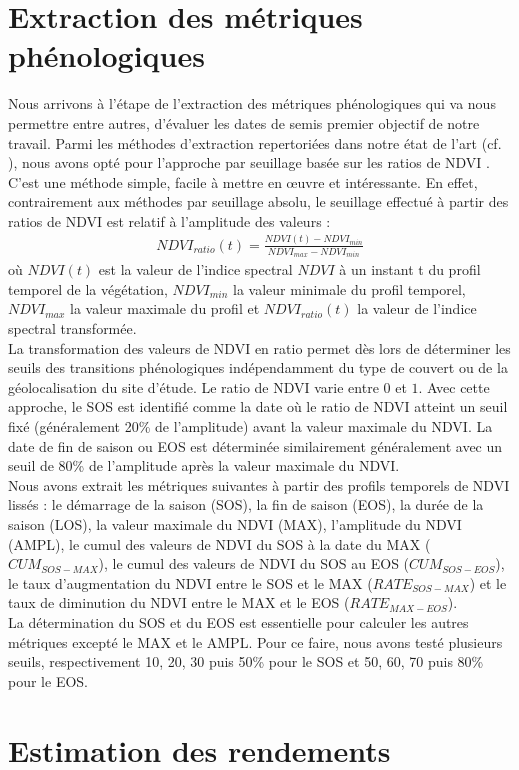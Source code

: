 \section{Extraction des métriques phénologiques}
Nous arrivons à l'étape de l'extraction des métriques phénologiques qui va nous permettre entre autres, d'évaluer les dates de semis premier objectif de notre travail. Parmi les méthodes d'extraction repertoriées dans notre état de l'art (cf. ), nous avons opté pour l'approche par seuillage basée sur les ratios de NDVI \citep{White1997}. C'est une méthode simple, facile à mettre en \oe uvre et intéressante. En effet, contrairement aux méthodes par seuillage absolu, le seuillage effectué à partir des ratios de NDVI est relatif à l'amplitude des valeurs : 
\begin{align}
 NDVI_{ratio}(t) = \frac{NDVI(t) - NDVI_{min}}{NDVI_{max}-NDVI_{min}} %
\end{align}
où $NDVI(t)$ est la valeur de l'indice spectral $NDVI$ à un instant t du profil temporel de la végétation, $NDVI_{min}$ la valeur minimale du profil temporel, $NDVI_{max}$ la valeur maximale du profil et $NDVI_{ratio}(t)$ la valeur de l'indice spectral transformée. 
\\La transformation des valeurs de NDVI en ratio permet dès lors de déterminer les seuils des transitions phénologiques indépendamment du type de couvert ou de la géolocalisation du site d'étude. Le ratio de NDVI varie entre $0$ et $1$. Avec cette approche, le SOS est identifié comme la date où le ratio de NDVI atteint un seuil fixé (généralement 20\% de l'amplitude) avant la valeur maximale du NDVI. La date de fin de saison ou EOS est déterminée similairement généralement avec un seuil de 80\% de l'amplitude après la valeur maximale du NDVI.
\\Nous avons extrait les métriques suivantes à partir des profils temporels de NDVI lissés : le démarrage de la saison (SOS), la fin de saison (EOS), la durée de la saison (LOS), la valeur maximale du NDVI (MAX), l'amplitude du NDVI (AMPL), le cumul des valeurs de NDVI du SOS à la date du MAX ($CUM_{SOS-MAX}$), le cumul des valeurs de NDVI du SOS au EOS ($CUM_{SOS-EOS}$), le taux d'augmentation du NDVI entre le SOS et le MAX ($RATE_{SOS-MAX}$) et le taux de diminution du NDVI entre le MAX et le EOS ($RATE_{MAX-EOS}$).
\\La détermination du SOS et du EOS est essentielle pour calculer les autres métriques excepté le MAX et le AMPL. Pour ce faire, nous avons testé plusieurs seuils, respectivement 10, 20, 30 puis 50\% pour le SOS et 50, 60, 70 puis 80\% pour le EOS.

\section{Estimation des rendements}
